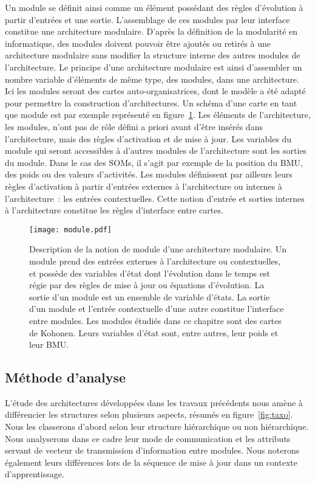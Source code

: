 \documentclass[../main]{subfiles}
\begin{document}
Un module se définit ainsi comme un élément possédant des règles d'évolution à partir d'entrées et une sortie. L'assemblage de ces modules par leur interface constitue une architecture modulaire. D'après la définition de la modularité en informatique, des modules doivent pouvoir être ajoutés ou retirés à une architecture modulaire sans modifier la structure interne des autres modules de l'architecture.
Le principe d'une architecture modulaire est ainsi d'assembler un nombre variable d'éléments de même type, des modules, dans une architecture. Ici les modules seront des cartes auto-organisatrices, dont le modèle a été adapté pour permettre la construction d'architectures. Un schéma d'une carte en tant que module est par exemple représenté en figure~\ref{fig:module}.
Les éléments de l'architecture, les modules, n'ont pas de rôle défini a priori avant d'être insérés dans l'architecture, mais des règles d'activation et de mise à jour.
Les variables du module qui seront accessibles à d'autres modules de l'architecture sont les sorties du module. Dans le cas des SOMs, il s'agit par exemple de la position du BMU, des poids ou des valeurs d'activités.
Les modules définissent par ailleurs leurs règles d'activation à partir d'entrées externes à l'architecture ou internes à l'architecture~: les entrées contextuelles.
Cette notion d'entrée et sorties internes à l'architecture constitue les règles d'interface entre cartes.



\begin{figure}
    \centering
    \texttt{[image: module.pdf]}
    \caption{Description de la notion de module d'une architecture modulaire. Un module prend des entrées externes à l'architecture ou contextuelles, et possède des variables d'état dont l'évolution dans le temps est régie par des règles de mise à jour ou équations d'évolution. La sortie d'un module est un ensemble de variable d'états. La sortie d'un module et l'entrée contextuelle d'une autre constitue l'interface entre modules. Les modules étudiés dans ce chapitre sont des cartes de Kohonen. Leurs variables d'état sont, entre autres, leur poids et leur BMU.\label{fig:module}}
\end{figure}

\subsection{Méthode d'analyse}

L'étude des architectures développées dans les travaux précédents nous amène à différencier les structures selon plusieurs aspects, résumés en figure~\ref{fig:taxo}. Nous les classerons d'abord selon leur structure hiérarchique ou non hiérarchique.
Nous analyserons dans ce cadre leur mode de communication et les attributs servant de vecteur de transmission d'information entre modules. 
Nous noterons également leurs différences lors de la séquence de mise à jour dans un contexte d'apprentissage.
\end{document}
